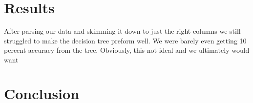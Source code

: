 \documentclass{article}
\begin{document}



\section*{Results}
\par
    After parsing our data and skimming it down to just the right columns we still struggled to make the decision tree preform well.
We were barely even getting 10 percent accuracy from the tree.
Obviously, this not ideal and we ultimately would want 

\section*{Conclusion}
\end{document}
